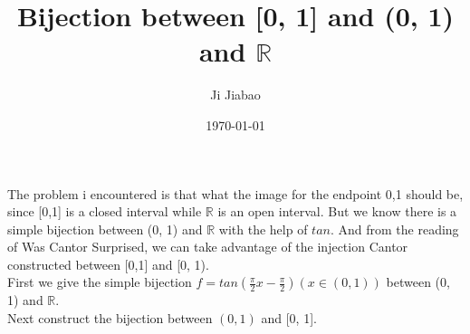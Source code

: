 \documentclass{article}
\title{Bijection between [0, 1] and (0, 1) and $\mathbb{R}$}
\author{Ji Jiabao}
\date{\today}
\begin{document}
    \maketitle
    The problem i encountered is that what the image for the endpoint 0,1 should be, 
    since [0,1] is a closed interval while $\mathbb{R}$ is an open interval. 
    But we know there is a simple bijection between (0, 1) and $\mathbb{R}$ with the help of $tan$.
    And from the reading of Was Cantor Surprised, we can take advantage of the injection
    Cantor constructed between [0,1] and [0, 1).\\

    First we give the simple bijection $f = tan(\frac{\pi}{2} x - \frac{\pi}{2}) (x \in (0, 1))$ between (0, 1) and $\mathbb{R}$.\\
    Next construct the bijection between $(0, 1)$ and [0, 1].
\end{document}
